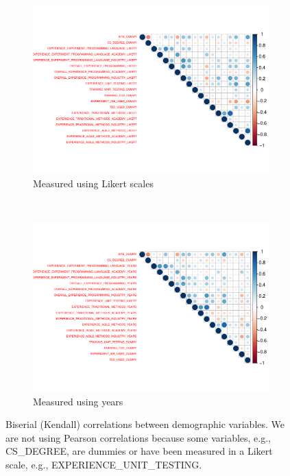 \documentclass[10pt,conference]{IEEEtran}\usepackage[]{graphicx}\usepackage[table,xcdraw]{xcolor}
\makeatletter
\def\maxwidth{ %
  \ifdim\Gin@nat@width>\linewidth
    \linewidth
  \else
    \Gin@nat@width
  \fi
}
\newenvironment{knitrout}{}{} %
\makeatother
\begin{document}
\begin{figure}[ht]
\centering
\begin{subfigure}{.8\textwidth}
  \centering
\begin{knitrout}
\color{fgcolor}
\includegraphics[width=\maxwidth]{figure/correlations_likert-1} 
\end{knitrout}
  \caption{Measured using Likert scales}
  \label{fig:correlations_likert}
\end{subfigure}%
\\
\begin{subfigure}{.8\textwidth}
  \centering
\begin{knitrout}
\color{fgcolor}
\includegraphics[width=\maxwidth]{figure/correlations_years-1} 
\end{knitrout}
    \caption{Measured using years}
    \label{fig:correlations_years}
\end{subfigure}
\caption{Biserial (Kendall) correlations between demographic variables. We are not using Pearson correlations because some variables, e.g., CS\_DEGREE, are dummies or have been measured in a Likert scale, e.g., EXPERIENCE\_UNIT\_TESTING.}
\label{fig:correlations}
\end{figure}
\end{document}
